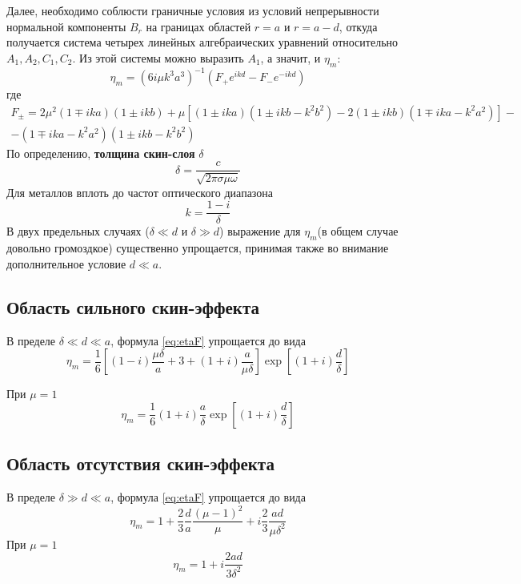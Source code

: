 \documentclass[a4paper,12pt]{article}
\begin{document}
Далее, необходимо соблюсти граничные условия из условий непрерывности нормальной компоненты $B_r$ на границах областей $r=a$ и $r=a-d$, откуда получается система четырех линейных алгебраических уравнений относительно $A_1,A_2,C_1,C_2$. Из этой системы можно выразить $A_1$, а значит, и $\eta_m$:
\begin{equation}
	\eta _ { m } = \left( 6 i \mu k ^ { 3 } a ^ { 3 } \right) ^ { - 1 } \left( F _ { + } e ^ { i k d } - F _ { - } e ^ { - i k d } \right)
	\label{eq:etaF}
\end{equation}
где
\begin{gather}
	 F _ { \pm } = 2 \mu ^ { 2 } ( 1 \mp i k a ) ( 1 \pm i k b ) +   \mu \left[ ( 1 \pm i k a ) \left( 1 \pm i k b - k ^ { 2 } b ^ { 2 } \right) - 2 ( 1 \pm i k b ) \left( 1 \mp i k a - k ^ { 2 } a ^ { 2 } \right) \right] - \\ - \left( 1 \mp i k a - k ^ { 2 } a ^ { 2 } \right) \left( 1 \pm i k b - k ^ { 2 } b ^ { 2 } \right) 
\end{gather}
По определению, \textbf{толщина скин-слоя} $\delta$
\begin{equation}
	\delta=\frac{c}{\sqrt{2\pi\sigma\mu\omega}}
\end{equation}
Для металлов вплоть до частот оптического диапазона
\begin{equation}
	k=\frac{1-i}{\delta}
\end{equation}
В двух предельных случаях ($\delta \ll d$  и $\delta \gg d$) выражение для $\eta_{m}$(в общем случае довольно громоздкое) существенно упрощается, принимая также во внимание дополнительное условие $d \ll a$.

\subsection{Область сильного скин-эффекта}
В пределе $\delta \ll d \ll a$, формула \eqref{eq:etaF} упрощается до вида
	\begin{equation} 
		\eta_{m}=\frac{1}{6}\left[(1-i) \frac{\mu \delta}{a}+3+(1+i) \frac{a}{\mu \delta}\right] \exp \left[(1+i) \frac{d}{\delta}\right]
	\label{eq:2}
	\end{equation}

При $\mu=1$
\begin{equation} 
	\eta_{m}=\frac{1}{6}(1+i) \frac{a}{\delta} \exp \left[(1+i) \frac{d}{\delta}\right]
\label{eq:3}
\end{equation}


\subsection{Область отсутствия скин-эффекта}
В пределе $\delta \gg d \ll a$, формула \eqref{eq:etaF} упрощается до вида
	\begin{equation}
		\eta_{m}=1+\frac{2}{3}\frac{d}{a}\frac{(\mu-1)^2}{\mu}+i\frac{2}{3}\frac{ad}{\mu \delta^2}
	\label{eq:4}
	\end{equation}
При $\mu=1$
\begin{equation} 
\eta_{m}=1+i \frac{2 a d}{3 \delta^{2}}
\label{eq:5}
\end{equation}
\end{document}
